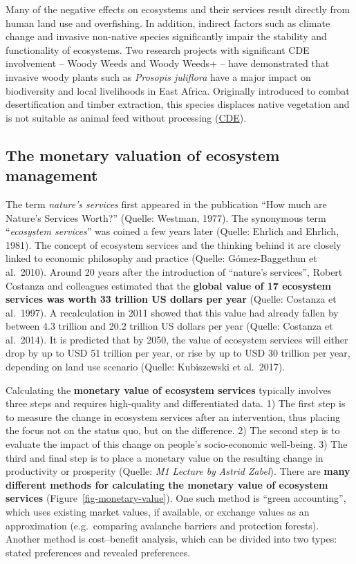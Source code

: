 \documentclass[
  a4paper,
  openany]{book}
\begin{document}
Many of the negative effects on ecosystems and their services result
directly from human land use and overfishing. In addition, indirect
factors such as climate change and invasive non-native species
significantly impair the stability and functionality of ecosystems. Two
research projects with significant CDE involvement -- Woody Weeds and
Woody Weeds+ -- have demonstrated that invasive woody plants such as
\emph{Prosopis juliflora} have a major impact on biodiversity and local
livelihoods in East Africa. Originally introduced to combat
desertification and timber extraction, this species displaces native
vegetation and is not suitable as animal feed without processing
(\href{https://www.cde.unibe.ch/forschung/projekte/woody_invasive_alien_species_in_eastern_africa/index_ger.html}{CDE}).

\subsection{The monetary valuation of ecosystem
management}\label{the-monetary-valuation-of-ecosystem-management}

The term \emph{nature's services} first appeared in the publication
``How much are Nature's Services Worth?'' (Quelle: Westman, 1977). The
synonymous term ``\emph{ecosystem services}'' was coined a few years
later (Quelle: Ehrlich and Ehrlich, 1981). The concept of ecosystem
services and the thinking behind it are closely linked to economic
philosophy and practice (Quelle: Gómez-Baggethun et al.~2010). Around 20
years after the introduction of ``nature's services'', Robert Costanza
and colleagues estimated that the \textbf{global value of 17 ecosystem
services was worth 33 trillion US dollars per year} (Quelle: Costanza et
al.~1997). A recalculation in 2011 showed that this value had already
fallen by between 4.3 trillion and 20.2 trillion US dollars per year
(Quelle: Costanza et al.~2014). It is predicted that by 2050, the value
of ecosystem services will either drop by up to USD 51 trillion per
year, or rise by up to USD 30 trillion per year, depending on land use
scenario (Quelle: Kubiszewski et al.~2017).

Calculating the \textbf{monetary value of ecosystem services} typically
involves three steps and requires high-quality and differentiated data.
1) The first step is to measure the change in ecosystem services after
an intervention, thus placing the focus not on the status quo, but on
the difference. 2) The second step is to evaluate the impact of this
change on people's socio-economic well-being. 3) The third and final
step is to place a monetary value on the resulting change in
productivity or prosperity (Quelle: \emph{M1 Lecture by} \emph{Astrid
Zabel}). There are \textbf{many different methods for calculating the
monetary value of ecosystem services} (Figure~\ref{fig-monetary-value}).
One such method is ``green accounting'', which uses existing market
values, if available, or exchange values as an approximation
(e.g.~comparing avalanche barriers and protection forests). Another
method is cost--benefit analysis, which can be divided into two types:
stated preferences and revealed preferences.
\end{document}
